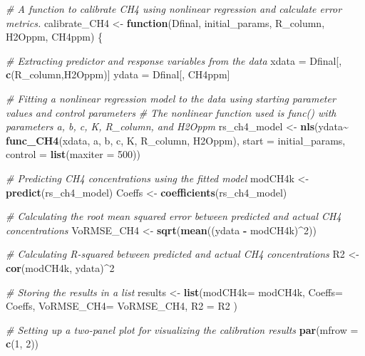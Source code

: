\documentclass[
]{article}
\newenvironment{Shaded}{\begin{snugshade}}{\end{snugshade}}
\newcommand{\AttributeTok}[1]{\textcolor[rgb]{0.13,0.29,0.53}{#1}}
\newcommand{\CommentTok}[1]{\textcolor[rgb]{0.56,0.35,0.01}{\textit{#1}}}
\newcommand{\ControlFlowTok}[1]{\textcolor[rgb]{0.13,0.29,0.53}{\textbf{#1}}}
\newcommand{\DecValTok}[1]{\textcolor[rgb]{0.00,0.00,0.81}{#1}}
\newcommand{\FunctionTok}[1]{\textcolor[rgb]{0.13,0.29,0.53}{\textbf{#1}}}
\newcommand{\NormalTok}[1]{#1}
\newcommand{\OtherTok}[1]{\textcolor[rgb]{0.56,0.35,0.01}{#1}}
\newcommand{\SpecialCharTok}[1]{\textcolor[rgb]{0.81,0.36,0.00}{\textbf{#1}}}
\begin{document}
\begin{Shaded}
\begin{Highlighting}[]
\CommentTok{\# A function to calibrate CH4 using nonlinear regression and calculate error metrics.}
\NormalTok{calibrate\_CH4 }\OtherTok{\textless{}{-}} \ControlFlowTok{function}\NormalTok{(Dfinal, initial\_params, R\_column, H2Oppm, CH4ppm)  \{}
  
  \CommentTok{\# Extracting predictor and response variables from the data}
\NormalTok{  xdata }\OtherTok{=}\NormalTok{ Dfinal[, }\FunctionTok{c}\NormalTok{(R\_column,H2Oppm)] }
\NormalTok{  ydata }\OtherTok{=}\NormalTok{ Dfinal[, CH4ppm]}
  
  \CommentTok{\# Fitting a nonlinear regression model to the data using starting parameter values and control parameters}
  \CommentTok{\# The nonlinear function used is func() with parameters a, b, c, K, R\_column, and H2Oppm}
\NormalTok{  rs\_ch4\_model }\OtherTok{\textless{}{-}} \FunctionTok{nls}\NormalTok{(ydata}\SpecialCharTok{\textasciitilde{}} \FunctionTok{func\_CH4}\NormalTok{(xdata, a, b, c, K, R\_column, H2Oppm), }
                      \AttributeTok{start =}\NormalTok{ initial\_params, }\AttributeTok{control =} \FunctionTok{list}\NormalTok{(}\AttributeTok{maxiter =} \DecValTok{500}\NormalTok{)) }
  
  \CommentTok{\# Predicting CH4 concentrations using the fitted model}
\NormalTok{  modCH4k }\OtherTok{\textless{}{-}} \FunctionTok{predict}\NormalTok{(rs\_ch4\_model)  }
\NormalTok{  Coeffs }\OtherTok{\textless{}{-}} \FunctionTok{coefficients}\NormalTok{(rs\_ch4\_model)}
  
  \CommentTok{\# Calculating the root mean squared error between predicted and actual CH4 concentrations}
\NormalTok{  VoRMSE\_CH4 }\OtherTok{\textless{}{-}} \FunctionTok{sqrt}\NormalTok{(}\FunctionTok{mean}\NormalTok{((ydata }\SpecialCharTok{{-}}\NormalTok{ modCH4k)}\SpecialCharTok{\^{}}\DecValTok{2}\NormalTok{))}
  
  \CommentTok{\# Calculating R{-}squared between predicted and actual CH4 concentrations}
\NormalTok{  R2 }\OtherTok{\textless{}{-}}\FunctionTok{cor}\NormalTok{(modCH4k, ydata)}\SpecialCharTok{\^{}}\DecValTok{2}
  
  \CommentTok{\# Storing the results in a list}
\NormalTok{  results }\OtherTok{\textless{}{-}} \FunctionTok{list}\NormalTok{(}\AttributeTok{modCH4k=}\NormalTok{ modCH4k, }
                  \AttributeTok{Coeffs=}\NormalTok{ Coeffs, }\AttributeTok{VoRMSE\_CH4=}\NormalTok{ VoRMSE\_CH4, }\AttributeTok{R2 =}\NormalTok{ R2 )}
  
  \CommentTok{\# Setting up a two{-}panel plot for visualizing the calibration results}
  \FunctionTok{par}\NormalTok{(}\AttributeTok{mfrow =} \FunctionTok{c}\NormalTok{(}\DecValTok{1}\NormalTok{, }\DecValTok{2}\NormalTok{))}
  

\end{Highlighting}
\end{Shaded}
\end{document}
